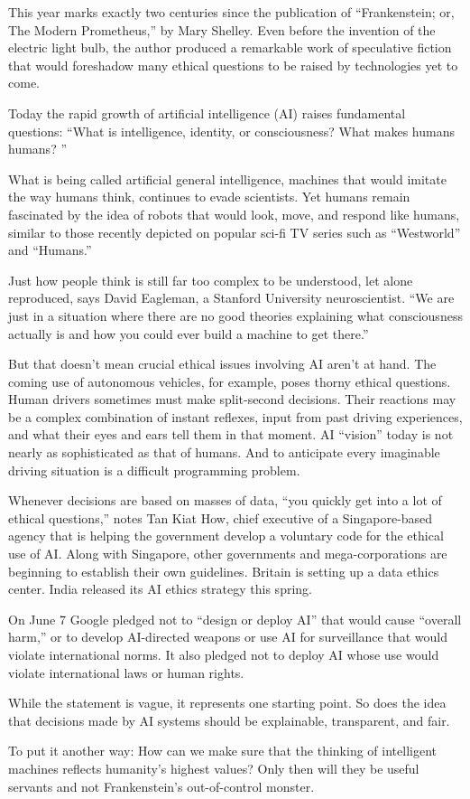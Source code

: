 This year marks exactly two centuries since the publication of ``Frankenstein; or, The Modern Prometheus,'' by Mary Shelley. Even before the invention of the electric light bulb, the author produced a remarkable work of speculative fiction that would foreshadow many ethical questions to be raised by technologies yet to come.


Today the rapid growth of artificial intelligence (AI) raises fundamental questions: ``What is intelligence, identity, or consciousness? What makes humans humans? ''


What is being called artificial general intelligence, machines that would imitate the way humans think, continues to evade scientists. Yet humans remain fascinated by the idea of robots that would look, move, and respond like humans, similar to those recently depicted on popular sci-fi TV series such as ``Westworld'' and ``Humans.''


Just how people think is still far too complex to be understood, let alone reproduced, says David Eagleman, a Stanford University neuroscientist. ``We are just in a situation where there are no good theories explaining what consciousness actually is and how you could ever build a machine to get there.''


But that doesn't mean crucial ethical issues involving AI aren't at hand. The coming use of autonomous vehicles, for example, poses thorny ethical questions. Human drivers sometimes must make split-second decisions. Their reactions may be a complex combination of instant reflexes, input from past driving experiences, and what their eyes and ears tell them in that moment. AI ``vision'' today is not nearly as sophisticated as that of humans. And to anticipate every imaginable driving situation is a difficult programming problem.


Whenever decisions are based on masses of data, ``you quickly get into a lot of ethical questions,'' notes Tan Kiat How, chief executive of a Singapore-based agency that is helping the government develop a voluntary code for the ethical use of AI. Along with Singapore, other governments and mega-corporations are beginning to establish their own guidelines. Britain is setting up a data ethics center. India released its AI ethics strategy this spring.


On June 7 Google pledged not to ``design or deploy AI'' that would cause ``overall harm,'' or to develop AI-directed weapons or use AI for surveillance that would violate international norms. It also pledged not to deploy AI whose use would violate international laws or human rights.


While the statement is vague, it represents one starting point. So does the idea that decisions made by AI systems should be explainable, transparent, and fair.


To put it another way: How can we make sure that the thinking of intelligent machines reflects humanity's highest values? Only then will they be useful servants and not Frankenstein's out-of-control monster.